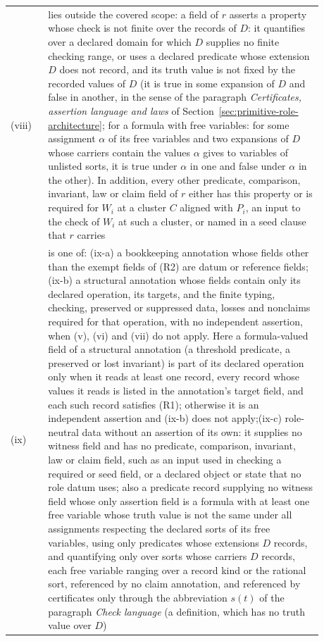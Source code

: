 \begin{longtable}{@{}l>{\raggedright\arraybackslash}p{0.88\linewidth}@{}}
(viii) & lies outside the covered scope: a field of \(r\) asserts a property whose check is not finite over the records of \(D\): it quantifies over a declared domain for which \(D\) supplies no finite checking range, or uses a declared predicate whose extension \(D\) does not record, and its truth value is not fixed by the recorded values of \(D\) (it is true in some expansion of \(D\) and false in another, in the sense of the paragraph \emph{Certificates, assertion language and laws} of Section~\ref{sec:primitive-role-architecture}; for a formula with free variables: for some assignment \(\alpha\) of its free variables and two expansions of \(D\) whose carriers contain the values \(\alpha\) gives to variables of unlisted sorts, it is true under \(\alpha\) in one and false under \(\alpha\) in the other). In addition, every other predicate, comparison, invariant, law or claim field of \(r\) either has this property or is required for \(W_i\) at a cluster \(C\) aligned with \(P_i\), an input to the check of \(W_i\) at such a cluster, or named in a seed clause that \(r\) carries \\
(ix) & is one of: (ix-a) a bookkeeping annotation whose fields other than the exempt fields of (R2) are datum or reference fields;\newline (ix-b) a structural annotation whose fields contain only its declared operation, its targets, and the finite typing, checking, preserved or suppressed data, losses and nonclaims required for that operation, with no independent assertion, when (v), (vi) and (vii) do not apply. Here a formula-valued field of a structural annotation (a threshold predicate, a preserved or lost invariant) is part of its declared operation only when it reads at least one record, every record whose values it reads is listed in the annotation's target field, and each such record satisfies (R1); otherwise it is an independent assertion and (ix-b) does not apply;\newline (ix-c) role-neutral data without an assertion of its own: it supplies no witness field and has no predicate, comparison, invariant, law or claim field, such as an input used in checking a required or seed field, or a declared object or state that no role datum uses; also a predicate record supplying no witness field whose only assertion field is a formula with at least one free variable whose truth value is not the same under all assignments respecting the declared sorts of its free variables, using only predicates whose extensions \(D\) records, and quantifying only over sorts whose carriers \(D\) records, each free variable ranging over a record kind or the rational sort, referenced by no claim annotation, and referenced by certificates only through the abbreviation \(s(t)\) of the paragraph \emph{Check language} (a definition, which has no truth value over \(D\)) \\

\end{longtable}
